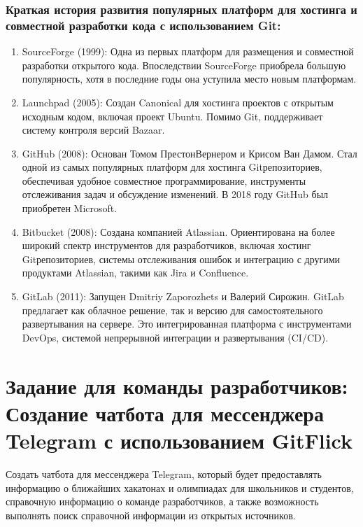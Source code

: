 \documentclass[letterpaper,10pt,russian]{sphinxmanual}
\begin{document}
\subsubsection{Краткая история развития популярных платформ для хостинга и совместной разработки кода с использованием Git:}
\label{\detokenize{educational_materials/team_work_on_a_gitflic/content:git}}\begin{enumerate}
%
\item {} 
\sphinxAtStartPar
SourceForge (1999): Одна из первых платформ для размещения и совместной разработки открытого кода. Впоследствии SourceForge приобрела большую популярность, хотя в последние годы она уступила место новым платформам.

\item {} 
\sphinxAtStartPar
Launchpad (2005): Создан Canonical для хостинга проектов с открытым исходным кодом, включая проект Ubuntu. Помимо Git, поддерживает систему контроля версий Bazaar.

\item {} 
\sphinxAtStartPar
GitHub (2008): Основан Томом Престон\sphinxhyphen{}Вернером и Крисом Ван Дамом. Стал одной из самых популярных платформ для хостинга Git\sphinxhyphen{}репозиториев, обеспечивая удобное совместное программирование, инструменты отслеживания задач и обсуждение изменений. В 2018 году GitHub был приобретен Microsoft.

\item {} 
\sphinxAtStartPar
Bitbucket (2008): Создана компанией Atlassian. Ориентирована на более широкий спектр инструментов для разработчиков, включая хостинг Git\sphinxhyphen{}репозиториев, системы отслеживания ошибок и интеграцию с другими продуктами Atlassian, такими как Jira и Confluence.

\item {} 
\sphinxAtStartPar
GitLab (2011): Запущен Dmitriy Zaporozhets и Валерий Сирожин. GitLab предлагает как облачное решение, так и версию для самостоятельного развертывания на сервере. Это интегрированная платформа с инструментами DevOps, системой непрерывной интеграции и развертывания (CI/CD).

\end{enumerate}

\sphinxstepscope


\section{Задание для команды разработчиков: Создание чат\sphinxhyphen{}бота для мессенджера Telegram с использованием GitFlick}
\label{\detokenize{educational_materials/team_work_on_a_gitflic/exercises:telegram-gitflick}}\label{\detokenize{educational_materials/team_work_on_a_gitflic/exercises::doc}}
\sphinxAtStartPar
{} Создать чат\sphinxhyphen{}бота для мессенджера Telegram, который будет предоставлять информацию о ближайших хакатонах и олимпиадах для школьников и студентов, справочную информацию о команде разработчиков, а также возможность выполнять поиск справочной информации из открытых источников.
\end{document}
